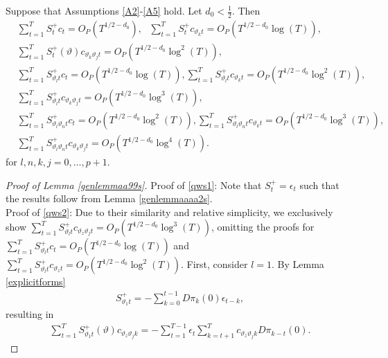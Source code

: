 {{\begin{lemma} \label{genlemmaa99s}
Suppose that Assumptions \ref{A2}-\ref{A5} hold. Let $d_0 < \frac{1}{2}$. Then
\begin{align} 
    &\sum_{t = 1}^T S_{t}^+ c_t = O_{P}(T^{1/2-d_0}), \ \ \ 
    \sum_{t = 1}^T S_{t}^+ c_{\vartheta_k t} = O_{P}(T^{1/2-d_0} \log(T)), \nonumber\\
    &\sum_{t = 1}^T S_{t}^+(\vartheta) c_{\vartheta_k \vartheta_j t} = O_{P}(T^{1/2-d_0} \log^2(T)), \label{qws1} \\
    & \sum_{t = 1}^T S_{\vartheta_l t}^+ c_t = O_{P}(T^{1/2-d_0} \log(T)),
    \sum_{t = 1}^T S_{\vartheta_l t}^+ c_{\vartheta_k t} = O_{P}(T^{1/2-d_0} \log^{2}(T)), \nonumber\\
    &\sum_{t = 1}^T S_{\vartheta_l t}^+ c_{\vartheta_k \vartheta_j t}= O_{P}(T^{1/2-d_0} \log^{3}(T)), \label{qws2}\\
     &\sum_{t = 1}^T S_{\vartheta_l \vartheta_n t}^+ c_t = O_{P}(T^{1/2-d_0} \log^{2}(T)),
    \sum_{t = 1}^T S_{\vartheta_l \vartheta_n t}^+ c_{\vartheta_k t} = O_{P}(T^{1/2-d_0} \log^{3}(T)), \nonumber \\
    &\sum_{t = 1}^T S_{\vartheta_l \vartheta_n t}^+ c_{\vartheta_k \vartheta_j t} = O_{P}(T^{1/2-d_0} \log^{4}(T)). \label{qws3}
\end{align}
for $l,n,k,j = 0,\ldots,p+1$.
\end{lemma}



\begin{proof}[Proof of Lemma \ref{genlemmaa99s}] Proof of \eqref{qws1}: Note that $S_{t}^+ = \epsilon_t $ such that the results follow from Lemma \ref{genlemmaaaa2s}.\\
Proof of \eqref{qws2}: Due to their similarity and relative simplicity, we exclusively show $\sum_{t = 1}^T S_{\vartheta_l t}^+ c_{\vartheta_z \vartheta_j t} = O_{P}(T^{1/2-d_0} \log^3(T))$, omitting the proofs for $\sum_{t = 1}^T S_{\vartheta_l t}^+ c_t  = O_{P}(T^{1/2-d_0} \log(T))$ and $\sum_{t = 1}^T S_{\vartheta_l t}^+ c_{\vartheta_z t} = O_{P}(T^{1/2-d_0} \log^{2}(T))$. First, consider $l = 1$. By Lemma \ref{explicitforms} 
\begin{align*}
S^{+}_{\vartheta_1 t} = - \sum_{k = 0}^{t-1} D\pi_k(0) \epsilon_{t-k}, 
\end{align*}
resulting in
\begin{align*}
    \sum_{t = 1}^{T} S_{\vartheta_1 t}^+(\vartheta)  c_{\vartheta_z \vartheta_j k} = -\sum_{t = 1}^{T-1} \epsilon_t \sum_{k = t+1}^T c_{\vartheta_z \vartheta_j k}  D\pi_{k-t}(0). 
\end{align*}


\end{proof}}}
